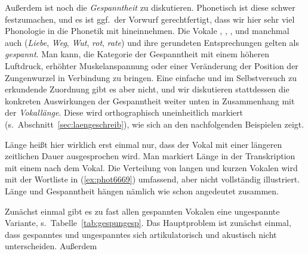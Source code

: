 Außerdem ist noch die \textit{Gespanntheit} zu diskutieren.
Phonetisch ist diese schwer festzumachen, und es ist ggf.\ der Vorwurf gerechtfertigt, dass wir hier sehr viel Phonologie in die Phonetik mit hineinnehmen.
Die Vokale \textipa{[i]}, \textipa{[e]}, \textipa{[u]}, \textipa{[o]} und manchmal auch \textipa{[a]} (\textit{Liebe}, \textit{Weg}, \textit{Wut}, \textit{rot}, \textit{rate}) und ihre gerundeten Entsprechungen gelten als \textit{gespannt}.
Man kann, die Kategorie der Gespanntheit mit einem höheren Luftdruck, erhöhter Muskelanspannung oder einer Veränderung der Position der Zungenwurzel in Verbindung zu bringen.
Eine einfache und im Selbstversuch zu erkundende Zuordnung gibt es aber nicht, und wir diskutieren stattdessen die konkreten Auswirkungen der Gespanntheit weiter unten in Zusammenhang mit der \textit{Vokallänge}.
Diese wird orthographisch uneinheitlich markiert (s.\ Abschnitt~\ref{sec:laengeschreib}), wie sich an den nachfolgenden Beispielen zeigt.


Länge heißt hier wirklich erst einmal nur, dass der Vokal mit einer längeren zeitlichen Dauer ausgesprochen wird.
Man markiert Länge in der Transkription mit einem \textipa{[:]} nach dem Vokal.
Die Verteilung von langen und kurzen Vokalen wird mit der Wortliste in (\ref{ex:phot6669}) umfassend, aber nicht vollständig illustriert.
Länge und Gespanntheit hängen nämlich wie schon angedeutet zusammen.

Zunächst einmal gibt es zu fast allen gespannten Vokalen eine ungespannte Variante, s.\ Tabelle~\ref{tab:gespungesp}.
Das Hauptproblem ist zunächst einmal, dass gespanntes und ungespanntes \textipa{[a]} sich artikulatorisch und akustisch nicht unterscheiden.
Außerdem 

